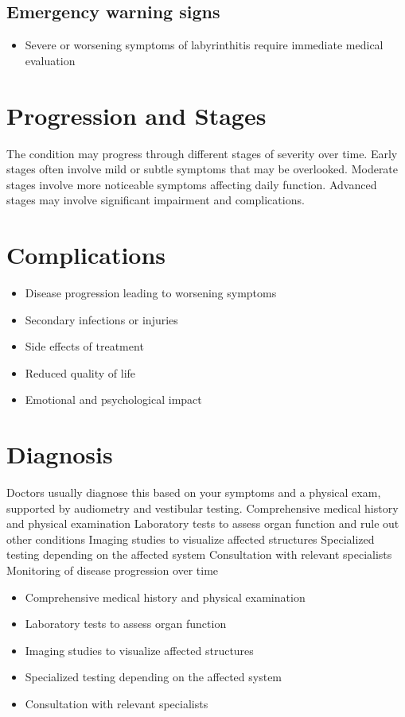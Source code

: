 \subsection{Emergency warning signs}
\begin{itemize}[noitemsep]
  \item Severe or worsening symptoms of labyrinthitis require immediate medical evaluation
\end{itemize}
\section{Progression and Stages}
The condition may progress through different stages of severity over time. Early stages often involve mild or subtle symptoms that may be overlooked. Moderate stages involve more noticeable symptoms affecting daily function. Advanced stages may involve significant impairment and complications.
\section{Complications}
\begin{itemize}[noitemsep]
  \item Disease progression leading to worsening symptoms
  \item Secondary infections or injuries
  \item Side effects of treatment
  \item Reduced quality of life
  \item Emotional and psychological impact
\end{itemize}
\section{Diagnosis}
Doctors usually diagnose this based on your symptoms and a physical exam, supported by audiometry and vestibular testing. Comprehensive medical history and physical examination Laboratory tests to assess organ function and rule out other conditions Imaging studies to visualize affected structures Specialized testing depending on the affected system Consultation with relevant specialists Monitoring of disease progression over time

\begin{itemize}[noitemsep]
  \item Comprehensive medical history and physical examination
  \item Laboratory tests to assess organ function
  \item Imaging studies to visualize affected structures
  \item Specialized testing depending on the affected system
  \item Consultation with relevant specialists
\end{itemize}
